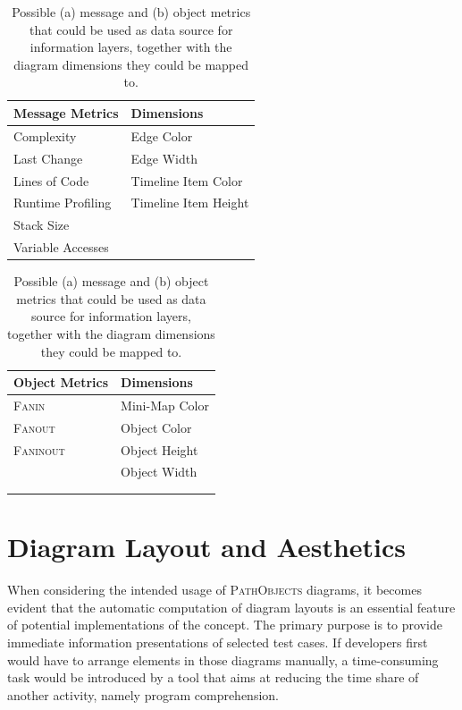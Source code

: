 \begin{table}[tb]
	\centering
	\footnotesize
	\begin{subtable}[t]{0.45\textwidth}
		\begin{tabular}{ll}
		\toprule[1.2pt]
		Message Metrics		& Dimensions 			\\
		\midrule
		Complexity			& Edge Color 			\\
		Last Change			& Edge Width			\\
		Lines of Code		& Timeline Item Color	\\
		Runtime Profiling	& Timeline Item Height	\\
		Stack Size			&						\\
		Variable Accesses	&						\\
		\bottomrule[1.2pt]
		\end{tabular}
		\caption[Message Metrics]{}
	\end{subtable}
	\qquad
	\begin{subtable}[t]{0.45\textwidth}
		\begin{tabular}{ll}
		\toprule[1.2pt]
		Object Metrics		& Dimensions 			\\
		\midrule
		\textsc{Fanin}		& Mini-Map Color		\\
		\textsc{Fanout}		& Object Color			\\
		\textsc{Faninout}	& Object Height			\\
		\hphantom{Runtime Profiling}	& Object Width			\\
							& \hphantom{Timeline Item Height} \\
							& \\
		\bottomrule[1.2pt]
		\end{tabular}
		\caption[Object Metrics]{}
	\end{subtable}
	\caption[Information Layers: Possible Metrics and Diagram Dimensions]{Possible (a) message and (b) object metrics that could be used as data source for information layers, together with the diagram dimensions they could be mapped to.}
	\label{t:ApproachLayers}
\end{table}


\section[Diagram Layout and Aesthetics]{Diagram Layout and Aesthetics%
}
\label{s:ApproachLayout}
When considering the intended usage of \textsc{PathObjects} diagrams, it becomes evident that the automatic computation of diagram layouts is an essential feature of potential implementations of the concept.
The primary purpose is to provide immediate information presentations of selected test cases.
If developers first would have to arrange elements in those diagrams manually, a time-consuming task would be introduced by a tool that aims at reducing the time share of another activity, namely program comprehension.

